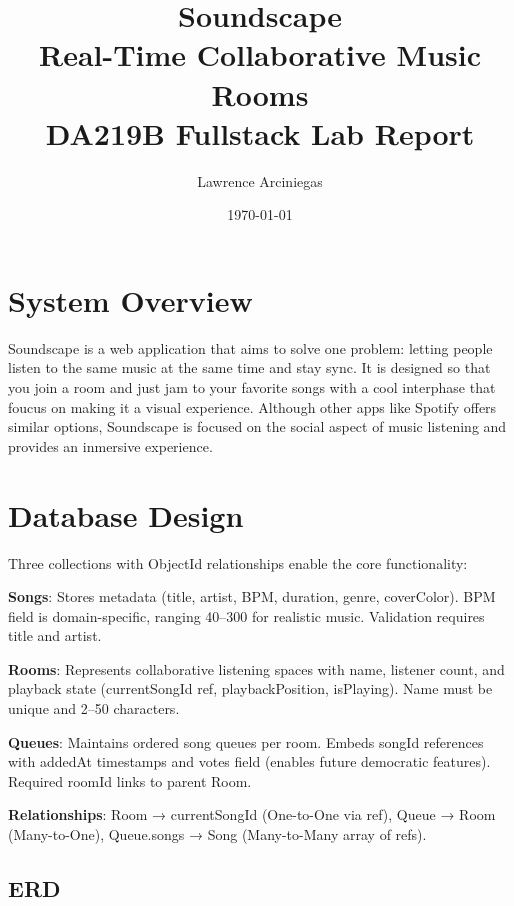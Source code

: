 \documentclass[11pt,a4paper]{article}
\title{\textbf{Soundscape} \\ Real-Time Collaborative Music Rooms \\ \small DA219B Fullstack Lab Report}
\author{Lawrence Arciniegas}
\date{\today}
\begin{document}
\maketitle

\newpage

\section{System Overview}

Soundscape is a web application that aims to solve one problem: letting people listen to the same music at the same time and stay sync. It is designed so that you join a room and just jam to your favorite songs with a cool interphase that foucus on making it a visual experience. Although other apps like Spotify offers similar options, Soundscape is focused on the social aspect of music listening and provides an inmersive experience.

\section{Database Design}

Three collections with ObjectId relationships enable the core functionality:

\textbf{Songs}: Stores metadata (title, artist, BPM, duration, genre, coverColor). BPM field is domain-specific, ranging 40--300 for realistic music. Validation requires title and artist.

\textbf{Rooms}: Represents collaborative listening spaces with name, listener count, and playback state (currentSongId ref, playbackPosition, isPlaying). Name must be unique and 2--50 characters.

\textbf{Queues}: Maintains ordered song queues per room. Embeds songId references with addedAt timestamps and votes field (enables future democratic features). Required roomId links to parent Room.

\textbf{Relationships}: Room → currentSongId (One-to-One via ref), Queue → Room (Many-to-One), Queue.songs → Song (Many-to-Many array of refs).

\subsection{ERD}
\end{document}
